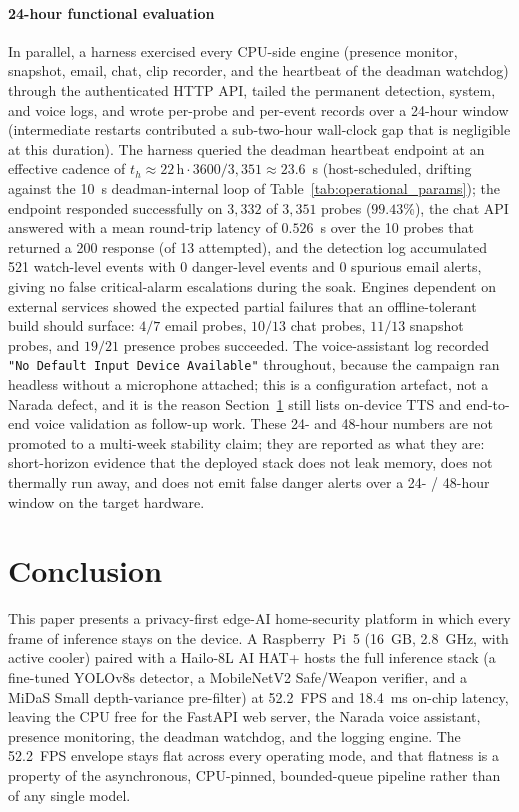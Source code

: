 \documentclass{ieeeaccess}
\begin{document}
\paragraph*{24-hour functional evaluation}
In parallel, a harness exercised every CPU-side engine (presence monitor, snapshot, email, chat, clip recorder, and the heartbeat of the deadman watchdog) through the authenticated HTTP API, tailed the permanent detection, system, and voice logs, and wrote per-probe and per-event records over a 24-hour window (intermediate restarts contributed a sub-two-hour wall-clock gap that is negligible at this duration). The harness queried the deadman heartbeat endpoint at an effective cadence of $t_h \approx 22\,\mathrm{h} \cdot 3600 / 3{,}351 \approx 23.6$~s (host-scheduled, drifting against the 10~s deadman-internal loop of Table~\ref{tab:operational_params}); the endpoint responded successfully on $3{,}332$ of $3{,}351$ probes ($99.43\%$), the chat API answered with a mean round-trip latency of $0.526$~s over the 10 probes that returned a 200 response (of 13 attempted), and the detection log accumulated 521 watch-level events with 0 danger-level events and 0 spurious email alerts, giving no false critical-alarm escalations during the soak. Engines dependent on external services showed the expected partial failures that an offline-tolerant build should surface: $4/7$ email probes, $10/13$ chat probes, $11/13$ snapshot probes, and $19/21$ presence probes succeeded. The voice-assistant log recorded \texttt{"No Default Input Device Available"} throughout, because the campaign ran headless without a microphone attached; this is a configuration artefact, not a Narada defect, and it is the reason Section~\ref{sec:conclusion} still lists on-device TTS and end-to-end voice validation as follow-up work. These 24- and 48-hour numbers are not promoted to a multi-week stability claim; they are reported as what they are: short-horizon evidence that the deployed stack does not leak memory, does not thermally run away, and does not emit false danger alerts over a 24- / 48-hour window on the target hardware.


\section{Conclusion}
\label{sec:conclusion}
This paper presents a privacy-first edge-AI home-security platform in which every frame of inference stays on the device. A Raspberry~Pi~5 (16~GB, 2.8~GHz, with active cooler) paired with a Hailo-8L AI HAT+ hosts the full inference stack (a fine-tuned YOLOv8s detector, a MobileNetV2 Safe/Weapon verifier, and a MiDaS Small depth-variance pre-filter) at 52.2~FPS and 18.4~ms on-chip latency, leaving the CPU free for the FastAPI web server, the Narada voice assistant, presence monitoring, the deadman watchdog, and the logging engine. The 52.2~FPS envelope stays flat across every operating mode, and that flatness is a property of the asynchronous, CPU-pinned, bounded-queue pipeline rather than of any single model.
\end{document}
